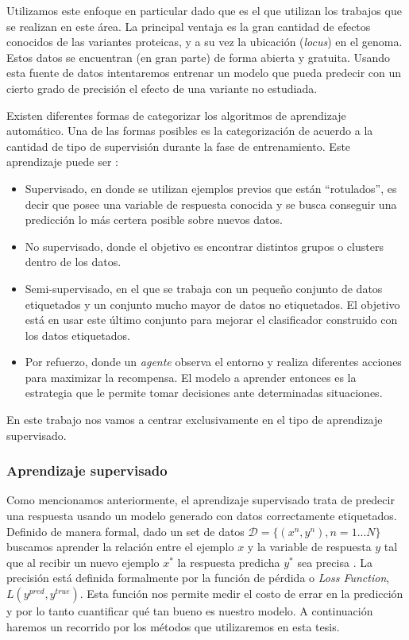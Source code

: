 Utilizamos este enfoque en particular dado que es el que utilizan los trabajos que se realizan en este área. La principal ventaja es la gran cantidad de efectos conocidos de las variantes proteicas, y a su vez la ubicación (\textit{locus}) en el genoma. Estos datos se encuentran (en gran parte) de forma abierta y gratuita. Usando esta fuente de datos intentaremos entrenar un modelo que pueda predecir con un cierto grado de precisión el efecto de una variante no estudiada. 

Existen diferentes formas de categorizar los algoritmos de aprendizaje automático. Una de las formas posibles es la categorización de acuerdo a la cantidad de tipo de supervisión durante la fase de entrenamiento. Este aprendizaje puede ser \cite{Barber2011}:

\begin{itemize}
\item Supervisado, en donde se utilizan ejemplos previos que están ``rotulados'', es decir que posee una variable de respuesta conocida y se busca conseguir una predicción lo más certera posible sobre nuevos datos. 
\item No supervisado, donde el objetivo es encontrar distintos grupos o clusters dentro de los datos.
\item Semi-supervisado, en el que se trabaja con un pequeño conjunto de datos etiquetados y un conjunto mucho mayor de datos no etiquetados. El objetivo está en usar este último conjunto para mejorar el clasificador construido con los datos etiquetados.
\item Por refuerzo, donde un \textit{agente} observa el entorno y realiza diferentes acciones para maximizar la recompensa. El modelo a aprender entonces es la estrategia que le permite tomar decisiones ante determinadas situaciones. 
\end{itemize}

En este trabajo nos vamos a centrar exclusivamente en el tipo de aprendizaje supervisado.

\subsubsection{Aprendizaje supervisado}

Como mencionamos anteriormente, el aprendizaje supervisado trata de predecir una respuesta usando un modelo generado con datos correctamente etiquetados. Definido de manera formal, dado un set de datos $ \mathcal{D} = \{(x^n, y^n), n = 1...N\}$  buscamos aprender la relación entre el ejemplo $x$ y la variable de respuesta $y$ tal que al recibir un nuevo ejemplo $x^*$ la respuesta predicha $y^*$ sea precisa \cite{Barber2011}. La precisión está definida formalmente por la función de pérdida o \textit{Loss Function}, $L(y^{pred}, y^{true})$. Esta función nos permite medir el costo de errar en la predicción y por lo tanto cuantificar qué tan bueno es nuestro modelo. A continuación haremos un recorrido por los métodos que utilizaremos en esta tesis.

